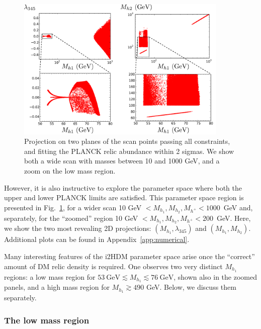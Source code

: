 \documentclass[12pt,a4paper]{article}
\begin{document}
\begin{figure}[htb]
\begin{center}
\includegraphics[width=0.9\textwidth]{Omega-monoc.pdf}
\caption{Projection on two planes of the scan points passing all constraints, and fitting the PLANCK relic abundance within 2 sigmas. We show both a wide scan with masses between 10 and 1000 GeV, and a zoom on the low mass region.  \label{fig:scan-simplified-fitting}} 
\end{center}
\end{figure}

However, it is also instructive to explore the parameter space where both
the upper and lower PLANCK limits are satisfied.
This parameter space region is presented in Fig.~\ref{fig:scan-simplified-fitting},
for a wider scan 10 GeV $< M_{h_1}, M_{h_2}, M_{h^{+}} < 1000$~GeV and, separately,
for the ``zoomed'' region 10 GeV $< M_{h_1}, M_{h_2}, M_{h^{+}} < 200$~GeV.
Here, we show the two most revealing 2D projections: $(M_{h_1},\lambda_{345})$ and $(M_{h_1},M_{h_2})$. 
Additional plots can be found in Appendix~\ref{app:numerical}.

Many interesting features of the i2HDM parameter space arise once the ``correct'' amount of DM relic density is required. 
One observes two very distinct $M_{h_1}$ regions:  
a low mass region for $53~\mbox{GeV} \lesssim M_{h_1} \lesssim 76~\mbox{GeV}$, shown also in the zoomed panels,
and a high mass region for $M_{h_1}\gtrsim 490$ GeV. Below, we discuss them separately.

\subsubsection{The low mass region}
\end{document}
